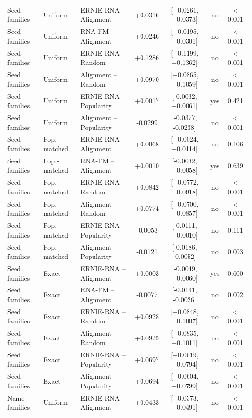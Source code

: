 {\begin{longtable}{lllcccc}
\midrule
Seed families & Uniform & ERNIE-RNA -- Alignment & +0.0316 & [+0.0261, +0.0373] & no & $<$0.001\\
Seed families & Uniform & RNA-FM -- Alignment & +0.0246 & [+0.0195, +0.0301] & no & $<$0.001\\
Seed families & Uniform & ERNIE-RNA -- Random & +0.1286 & [+0.1199, +0.1362] & no & $<$0.001\\
Seed families & Uniform & Alignment -- Random & +0.0970 & [+0.0865, +0.1059] & no & $<$0.001\\
Seed families & Uniform & ERNIE-RNA -- Popularity & +0.0017 & [-0.0032, +0.0061] & yes & 0.421\\
Seed families & Uniform & Alignment -- Popularity & -0.0299 & [-0.0377, -0.0238] & no & $<$0.001\\
Seed families & Pop.-matched & ERNIE-RNA -- Alignment & +0.0068 & [+0.0024, +0.0114] & no & 0.106\\
Seed families & Pop.-matched & RNA-FM -- Alignment & +0.0010 & [-0.0032, +0.0058] & yes & 0.639\\
Seed families & Pop.-matched & ERNIE-RNA -- Random & +0.0842 & [+0.0772, +0.0918] & no & $<$0.001\\
Seed families & Pop.-matched & Alignment -- Random & +0.0774 & [+0.0700, +0.0857] & no & $<$0.001\\
Seed families & Pop.-matched & ERNIE-RNA -- Popularity & -0.0053 & [-0.0111, +0.0010] & no & 0.111\\
Seed families & Pop.-matched & Alignment -- Popularity & -0.0121 & [-0.0186, -0.0052] & no & 0.003\\
Seed families & Exact & ERNIE-RNA -- Alignment & +0.0003 & [-0.0049, +0.0060] & yes & 0.600\\
Seed families & Exact & RNA-FM -- Alignment & -0.0077 & [-0.0131, -0.0026] & no & 0.002\\
Seed families & Exact & ERNIE-RNA -- Random & +0.0928 & [+0.0848, +0.1007] & no & $<$0.001\\
Seed families & Exact & Alignment -- Random & +0.0925 & [+0.0835, +0.1011] & no & $<$0.001\\
Seed families & Exact & ERNIE-RNA -- Popularity & +0.0697 & [+0.0619, +0.0794] & no & $<$0.001\\
Seed families & Exact & Alignment -- Popularity & +0.0694 & [+0.0604, +0.0799] & no & $<$0.001\\
\midrule
Name families & Uniform & ERNIE-RNA -- Alignment & +0.0433 & [+0.0373, +0.0491] & no & $<$0.001\\

\end{longtable}}
